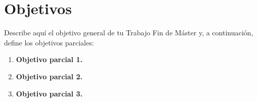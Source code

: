 
\cleardoublepage

\chapter{Objetivos}
\label{objetivos}

Describe aquí el objetivo general de tu Trabajo Fin de Máster y, a continuación, define los objetivos parciales:
\medskip
\begin{enumerate}[label=\destacado{\arabic*.}]
  \setlength\itemsep{1em}
  \item \textbf{Objetivo parcial 1.}

  \item \textbf{Objetivo parcial 2.}

  \item \textbf{Objetivo parcial 3.}
\end{enumerate}
